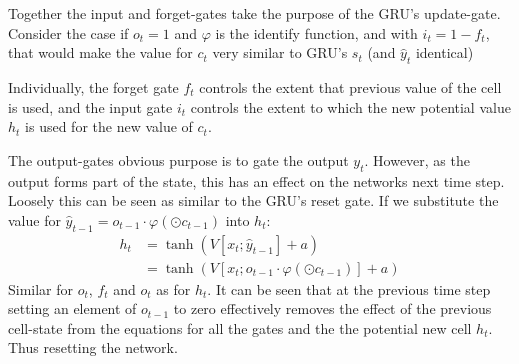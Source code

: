 \documentclass[12pt,parskip]{komatufte}\right
\begin{document}
Together the input and forget-gates take the purpose of the GRU's update-gate.
Consider the case if $o_t=1$ and $\varphi$ is the identify function,
and with $i_t=1-f_t$, that would make the value for $c_t$ very similar to GRU's $s_t$ (and $\hat{y}_t$ identical)

Individually, the forget gate $f_t$ controls the extent that previous value of the cell is used,
and the input gate $i_t$ controls the extent to which the new potential value $h_t$ is used for the new value of $c_t$.

The output-gates obvious purpose is to gate the output $y_t$.
However, as the output forms part of the state,
this has an effect on the networks next time step.
Loosely this can be seen as similar to the GRU's reset gate.
If we substitute the value for $\hat{y}_{t-1} = o_{t-1}\cdot\varphi(\odot c_{t-1})$
into $h_t$:
\begin{align}
h_t &= \tanh \left( V[x_t; \hat{y}_{t-1}] + a \right) \\
&=\tanh \left( V[x_t; o_{t-1}\cdot\varphi(\odot c_{t-1})] + a \right)
\end{align}
Similar for $o_t$, $f_t$ and $o_t$ as for $h_t$.
It can be seen that at the previous time step setting an element of $o_{t-1}$ to zero effectively removes the effect of the previous cell-state from the equations for all the gates and the the potential new cell $h_t$.
Thus resetting the network.
\end{document}
